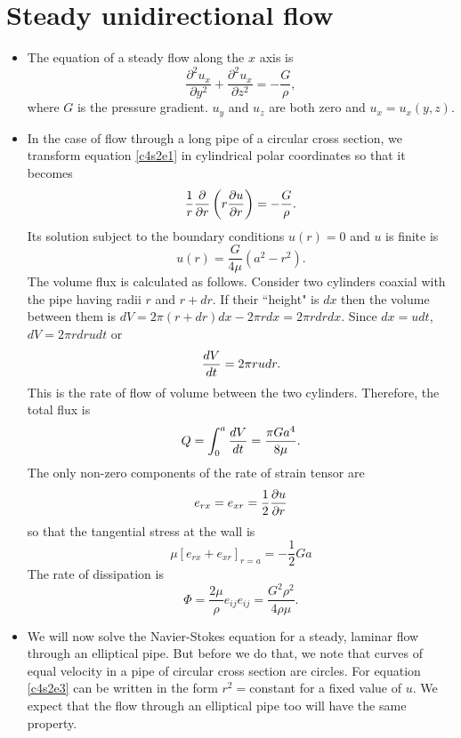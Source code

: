 \section{Steady unidirectional flow}\label{c4s2}
\begin{itemize}
\item The equation of a steady flow along the $x$ axis is
\begin{equation}\label{c4s2e1}
\frac{\partial^2 u_x}{\partial y^2} + \frac{\partial^2 u_x}{\partial z^2} = -\frac{G}{\rho},
\end{equation}
where $G$ is the pressure gradient. $u_y$ and $u_z$ are both zero and $u_x = u_x(y, z)$.

\item In the case of flow through a long pipe of a circular cross section, we transform equation \eqref{c4s2e1}
in cylindrical polar coordinates so that it becomes
\begin{equation}\label{c4s2e2}
\frac{1}{r}\frac{\partial}{\partial r}\left(r\frac{\partial{u}}{\partial{r}}\right) = -\frac{G}{\rho}.
\end{equation}
Its solution subject to the boundary conditions $u(r) = 0$ and $u$ is finite is
\begin{equation}\label{c4s2e3}
u(r) = \frac{G}{4\mu}(a^2 - r^2).
\end{equation}
The volume flux is calculated as follows. Consider two cylinders coaxial with the pipe having radii $r$ and $r + 
dr$. If their ``height" is $dx$ then the volume between them is $dV = 2\pi (r + dr) dx - 2\pi rdx = 2\pi rdrdx$.
Since $dx = udt$, $dV = 2\pi r dr u dt$ or
\[
\frac{d{V}}{d{t}} = 2\pi r u dr.
\]
This is the rate of flow of volume between the two cylinders. Therefore, the total flux is
\begin{equation}\label{c4s2e4}
Q = \int_0^a \frac{d{V}}{d{t}} = \frac{\pi G a^4}{8\mu}.
\end{equation}
The only non-zero components of the rate of strain tensor are
\[
e_{rx} = e_{xr} = \frac{1}{2}\frac{\partial{u}}{\partial{r}}
\]
so that the tangential stress at the wall is
\[
\mu\left[e_{rx} + e_{xr}\right]_{r=a} = -\frac{1}{2}Ga
\]
The rate of dissipation is
\[
\Phi = \frac{2\mu}{\rho}e_{ij}e_{ij} = \frac{G^2\rho^2}{4\rho\mu}.
\]

\item We will now solve the Navier-Stokes equation for a steady, laminar flow through an elliptical pipe. But
before we do that, we note that curves of equal velocity in a pipe of circular cross section are circles. For
equation \eqref{c4s2e3} can be written in the form $r^2 = $constant for a fixed value of $u$. We expect that the
flow through an elliptical pipe too will have the same property.


\end{itemize}
